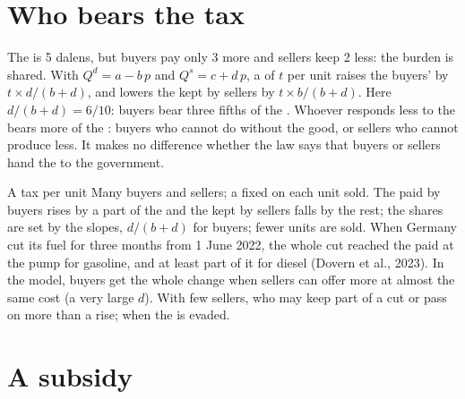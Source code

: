 \section{Who bears the tax}

The  is 5 dalens, but buyers pay only 3 more and sellers keep 2 less: the burden is shared. With
$Q^d = a - b\,p$ and $Q^s = c + d\,p$, a  of $t$ per unit raises the buyers'  by $t \times
d/(b + d)$, and lowers the  kept by sellers by $t \times b/(b + d)$. Here $d/(b + d) = 6/10$: buyers bear
three fifths of the . Whoever responds less to the  bears more of the : buyers who cannot do
without the good, or sellers who cannot produce less. It makes no difference whether the law says that
buyers or sellers hand the  to the government.

\begin{model}{A tax per unit}
\assumes Many buyers and sellers; a fixed  on each unit sold.
\predicts The  paid by buyers rises by a part of the  and the  kept by sellers falls by the
rest; the shares are set by the slopes, $d/(b + d)$ for buyers; fewer units are sold.
\tested When Germany cut its fuel  for three months from 1 June 2022, the whole cut reached the 
paid at the pump for gasoline, and at least part of it for diesel (Dovern et al., 2023). In the model, buyers
get the whole change when sellers can offer more at almost the same cost (a very large $d$).
\breaks With few sellers, who may keep part of a  cut or pass on more than a  rise; when the  is
evaded.
\end{model}

\section{A subsidy}

